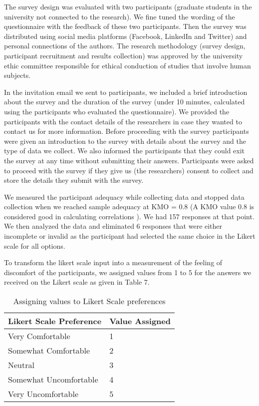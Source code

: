 \documentclass[10pt]{article}
\begin{document}
The survey design was evaluated with two participants (graduate students in the university not connected to the research). We fine tuned the wording of the questionnaire with the feedback of these two participants. Then the survey was distributed using social media platforms (Facebook, LinkedIn and Twitter) and personal connections of the authors. The research methodology (survey design, participant recruitment and results collection) was approved by the university ethic committee responsible for ethical conduction of studies that involve human subjects. 

In the invitation email we sent to participants, we included a brief introduction about the survey and the duration of the survey (under 10 minutes, calculated using the participants who evaluated the questionnaire). We provided the participants with the contact details of the researchers in case they wanted to contact us for more information. Before proceeding with the survey participants were given an introduction to the survey with details about the survey and the type of data we collect. We also informed the participants that they could exit the survey at any time without submitting their answers. Participants were asked to proceed with the survey if they give us (the researchers) consent to collect and store the details they submit with the survey.

We measured the participant adequacy while collecting data and stopped data collection when we reached sample adequacy at KMO = 0.8 (A KMO value $0.8$ is considered good in calculating correlations \cite {kim1978factor}). We had 157 responses at that point. We then analyzed the data and eliminated 6 responses that were either incomplete or invalid as the participant had selected the same choice in the Likert scale for all options.

To transform the likert scale input into a measurement of the feeling of discomfort of the participants, we assigned values from 1 to 5 for the answers we received on the Likert scale as given in Table 7.

\begin{center}
\begin{table}[htbp]
\caption{Assigning values to Likert Scale preferences}
\begin{center}
\begin{tabular}{|l|l|} 
\hline
Likert Scale Preference & Value Assigned \\
\hline
Very Comfortable & 1\\
\hline
Somewhat Comfortable& 2 \\
\hline
Neutral & 3  \\
\hline
Somewhat Uncomfortable & 4 \\
\hline
Very Uncomfortable & 5 \\
\hline
\end{tabular}
\end{center}
\end{table}
\end{center}
\end{document}
